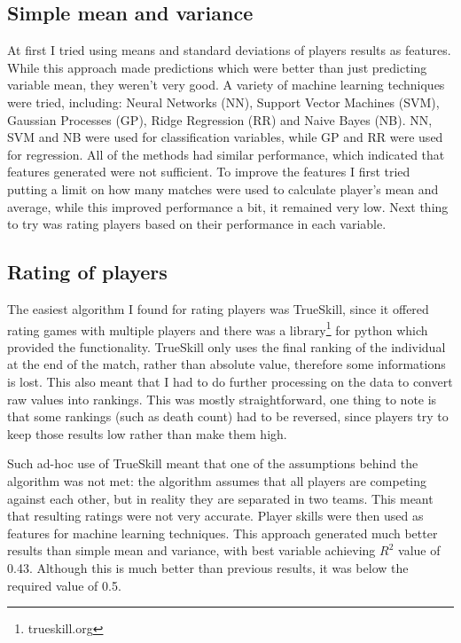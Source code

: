 \documentclass[12pt,a4paper]{book}
\begin{document}
\subsection{Simple mean and variance}
At first I tried using means and standard deviations of players results as features.
While this approach made predictions which were better than just predicting variable mean, they weren't very good.
A variety of machine learning techniques were tried, including: Neural Networks (NN), Support Vector Machines (SVM), Gaussian Processes (GP), Ridge Regression (RR) and Naive Bayes (NB).
NN, SVM and NB were used for classification variables, while GP and RR were used for regression.
All of the methods had similar performance, which indicated that features generated were not sufficient.
To improve the features I first tried putting a limit on how many matches were used to calculate player's mean and average, while this improved performance a bit, it remained very low.
Next thing to try was rating players based on their performance in each variable.

\subsection{Rating of players}
The easiest algorithm I found for rating players was TrueSkill, since it offered rating games with multiple players and there was a library\footnote{trueskill.org} for python which provided the functionality.
TrueSkill only uses the final ranking of the individual at the end of the match, rather than absolute value, therefore some informations is lost.
This also meant that I had to do further processing on the data to convert raw values into rankings.
This was mostly straightforward, one thing to note is that some rankings (such as death count) had to be reversed, since players try to keep those results low rather than make them high.

Such ad-hoc use of TrueSkill meant that one of the assumptions behind the algorithm was not met:
the algorithm assumes that all players are competing against each other, but in reality they are separated in two teams.
This meant that resulting ratings were not very accurate.
Player skills were then used as features for machine learning techniques.
This approach generated much better results than simple mean and variance, with best variable achieving $R^2$ value of 0.43.
Although this is much better than previous results, it was below the required value of 0.5.
\end{document}
